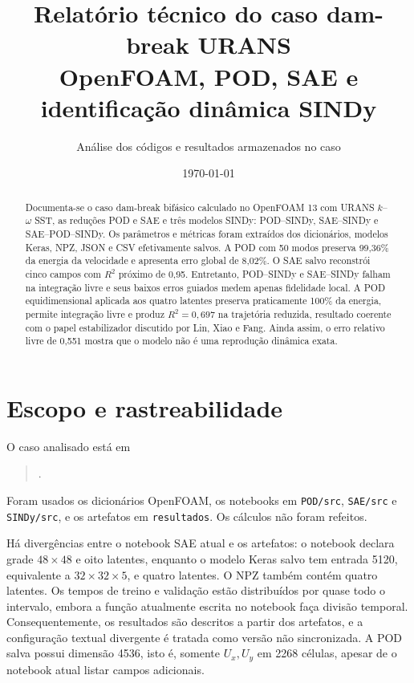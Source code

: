 \documentclass[12pt,a4paper]{article}
\title{\textbf{Relatório técnico do caso dam-break URANS}\\[0.4em]OpenFOAM, POD, SAE e identificação dinâmica SINDy}
\author{Análise dos códigos e resultados armazenados no caso}\date{\today}
\newcommand{\code}[1]{\texttt{#1}}
\begin{document}
\maketitle
\begin{abstract}
Documenta-se o caso dam-break bifásico calculado no OpenFOAM 13 com URANS $k$--$\omega$ SST, as reduções POD e SAE e três modelos SINDy: POD--SINDy, SAE--SINDy e SAE--POD--SINDy. Os parâmetros e métricas foram extraídos dos dicionários, modelos Keras, NPZ, JSON e CSV efetivamente salvos. A POD com 50 modos preserva 99,36\% da energia da velocidade e apresenta erro global de 8,02\%. O SAE salvo reconstrói cinco campos com $R^2$ próximo de 0,95. Entretanto, POD--SINDy e SAE--SINDy falham na integração livre e seus baixos erros guiados medem apenas fidelidade local. A POD equidimensional aplicada aos quatro latentes preserva praticamente 100\% da energia, permite integração livre e produz $R^2=0,697$ na trajetória reduzida, resultado coerente com o papel estabilizador discutido por Lin, Xiao e Fang. Ainda assim, o erro relativo livre de 0,551 mostra que o modelo não é uma reprodução dinâmica exata.
\end{abstract}
\tableofcontents\listoffigures\listoftables\clearpage

\section{Escopo e rastreabilidade}
O caso analisado está em
\begin{quote}\small{}.\end{quote}
Foram usados os dicionários OpenFOAM, os notebooks em \code{POD/src}, \code{SAE/src} e \code{SINDy/src}, e os artefatos em \code{resultados}. Os cálculos não foram refeitos.

Há divergências entre o notebook SAE atual e os artefatos: o notebook declara grade $48\times48$ e oito latentes, enquanto o modelo Keras salvo tem entrada 5120, equivalente a $32\times32\times5$, e quatro latentes. O NPZ também contém quatro latentes. Os tempos de treino e validação estão distribuídos por quase todo o intervalo, embora a função atualmente escrita no notebook faça divisão temporal. Consequentemente, os resultados são descritos a partir dos artefatos, e a configuração textual divergente é tratada como versão não sincronizada. A POD salva possui dimensão 4536, isto é, somente $U_x,U_y$ em 2268 células, apesar de o notebook atual listar campos adicionais.
\end{document}
